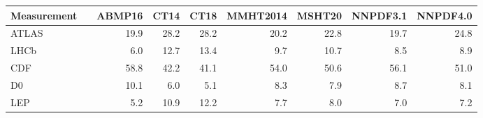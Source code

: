 \begin{tabular}{l@{\extracolsep{\fill}}rrrrrrrr}
  \hline \hline
Measurement                 &     &    ABMP16  &      CT14  &      CT18  &  MMHT2014  &    MSHT20  &   NNPDF3.1  &   NNPDF4.0 \\
\hline
                      ATLAS &     &    19.9  &    28.2  &    28.2  &    20.2  &    22.8  &    19.7  &    24.8 \\
                      LHCb  &     &     6.0  &    12.7  &    13.4  &     9.7  &    10.7  &     8.5  &     8.9 \\
                      CDF   &  &    58.8  &    42.2  &    41.1  &    54.0  &    50.6  &    56.1  &    51.0 \\
                      D0    &  &    10.1  &     6.0  &     5.1  &     8.3  &     7.9  &     8.7  &     8.1 \\
                      LEP   &     &     5.2  &    10.9  &    12.2  &     7.7  &     8.0  &     7.0  &     7.2 \\
\hline \hline
\end{tabular}
